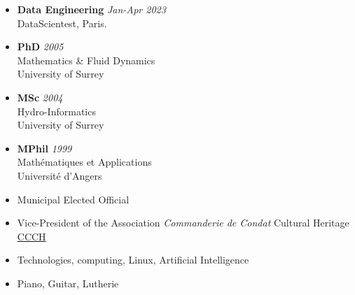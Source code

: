 \documentclass[11 pt,oneside,a4paper,titlepage]{article}
\begin{document}
{\begin{minipage}{6.3cm}
        \begin{itemize}[leftmargin=*]
         \item {\textbf{Data Engineering} \textit{Jan-Apr 2023}\\
         DataScientest, Paris.}   
         \item {\textbf{PhD} \textit{2005} \\
        Mathematics \& Fluid Dynamics\\
        University of Surrey}
        \item {\textbf{MSc} \textit{2004} \\
        Hydro-Informatics\\
        University of Surrey}
        \item{\textbf{MPhil} \textit{1999} \\
        Mathématiques et Applications\\
        Université d'Angers}
        \end{itemize}

        \begin{itemize}[leftmargin=*]
            \item{Municipal Elected Official}
            \item{Vice-President of the Association \textit{Commanderie de Condat} Cultural Heritage \href{https://commanderiecondat.fr/}{CCCH}}
            \item{Technologies, computing, Linux, Artificial Intelligence}
            \item{Piano, Guitar, Lutherie}
        \end{itemize}
    \end{minipage}} %
\end{document}
